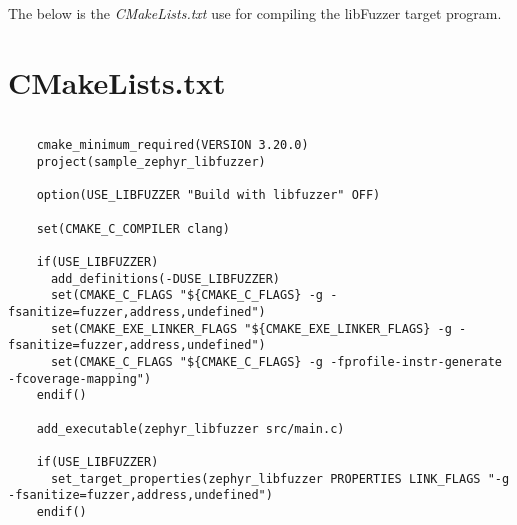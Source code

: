 \pagebreak


The below is the \textit{CMakeLists.txt} use for compiling the
libFuzzer target program.

\section*{CMakeLists.txt}

\begin{verbatim}

    cmake_minimum_required(VERSION 3.20.0)
    project(sample_zephyr_libfuzzer)

    option(USE_LIBFUZZER "Build with libfuzzer" OFF)

    set(CMAKE_C_COMPILER clang)

    if(USE_LIBFUZZER)
      add_definitions(-DUSE_LIBFUZZER)
      set(CMAKE_C_FLAGS "${CMAKE_C_FLAGS} -g -fsanitize=fuzzer,address,undefined")
      set(CMAKE_EXE_LINKER_FLAGS "${CMAKE_EXE_LINKER_FLAGS} -g -fsanitize=fuzzer,address,undefined")
      set(CMAKE_C_FLAGS "${CMAKE_C_FLAGS} -g -fprofile-instr-generate -fcoverage-mapping")
    endif()

    add_executable(zephyr_libfuzzer src/main.c)

    if(USE_LIBFUZZER)
      set_target_properties(zephyr_libfuzzer PROPERTIES LINK_FLAGS "-g -fsanitize=fuzzer,address,undefined")
    endif()

\end{verbatim}
\label{lst:cmake_list_txt_libfuzzer}